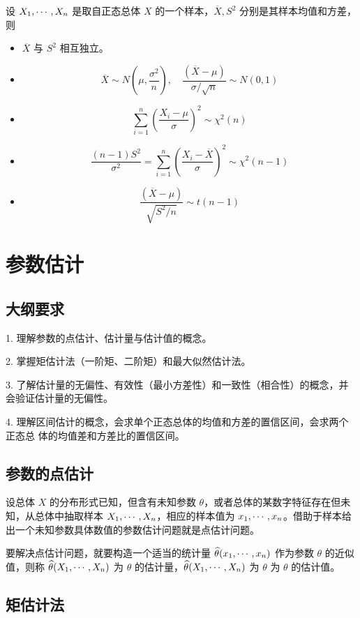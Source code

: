 设 $X_1,\cdots,X_n$ 是取自正态总体 $X$ 的一个样本，$\overline{X}, S^2$ 分别是其样本均值和方差，则
\begin{itemize}
	\item $\overline{X}$ 与 $S^2$ 相互独立。
	\item \[ \overline{X} \sim N\left(\mu, \frac{\sigma^2}{n}\right), \quad \frac{(\overline{X}-\mu)}{\sigma / \sqrt{n}} \sim N(0, 1) \]
	\item \[ \sum_{i=1}^{n} \left(\frac{X_i - \mu}{\sigma}\right)^2 \sim \chi^2(n) \]
	\item \[ \frac{(n-1)S^2}{\sigma^2} = \sum_{i=1}^n \left(\frac{X_i - \overline{X}}{\sigma}\right)^2 \sim \chi^2(n-1) \]
	\item \[ \frac{(\overline{X}-\mu)}{\sqrt{S^2 / n}} \sim t(n-1) \]
\end{itemize}

\section{参数估计}

\subsection{大纲要求}

1. 理解参数的点估计、估计量与估计值的概念。

2. 掌握矩估计法（一阶矩、二阶矩）和最大似然估计法。

3. 了解估计量的无偏性、有效性（最小方差性）和一致性（相合性）的概念，并会验证估计量的无偏性。

4. 理解区间估计的概念，会求单个正态总体的均值和方差的置信区间，会求两个正态总
体的均值差和方差比的置信区间。

\subsection{参数的点估计}

设总体 $X$ 的分布形式已知，但含有未知参数 $\theta$，或者总体的某数字特征存在但未知，从总体中抽取样本 $X_1,\cdots,X_n$，相应的样本值为 $x_1,\cdots,x_n$。借助于样本给出一个未知参数具体数值的参数估计问题就是点估计问题。

要解决点估计问题，就要构造一个适当的统计量 $\widehat{\theta}(x_1,\cdots,x_n)$ 作为参数 $\theta$ 的近似值，则称 $\widehat{\theta}(X_1,\cdots,X_n)$ 为 $\theta$ 的估计量，$\widehat{\theta}(X_1,\cdots,X_n)$ 为 $\theta$ 为 $\theta$ 的估计值。

\subsection{矩估计法}

